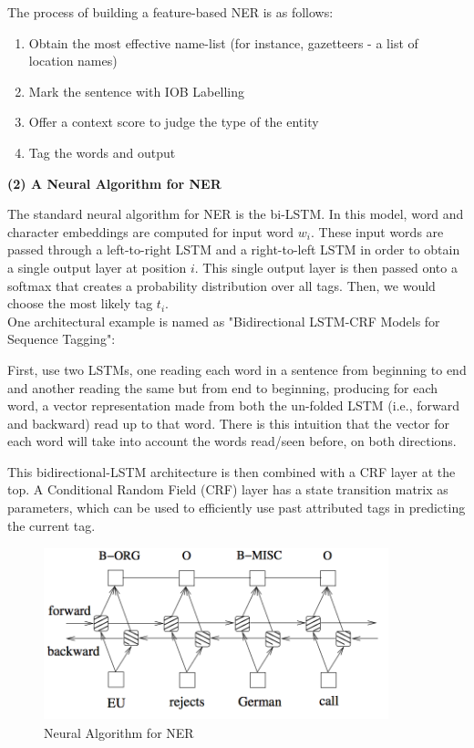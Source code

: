 \documentclass[a4paper,12pt]{report}
\begin{document}
\noindent
The process of building a feature-based NER is as follows:
\begin{enumerate}
\item Obtain the most effective name-list (for instance, gazetteers - a list of location names)
\item Mark the sentence with IOB Labelling
\item Offer a context score to judge the type of the entity
\item Tag the words and output 
\end{enumerate}

\noindent 
\textbf{(2) A Neural Algorithm for NER}

\noindent
The standard neural algorithm for NER is the bi-LSTM. In this model, word and character embeddings are computed for input word $w_i$. These input words are passed through a left-to-right LSTM and a right-to-left LSTM in order to obtain a single output layer at position $i$. This single output layer is then passed onto a softmax that creates a probability distribution over all tags. Then, we would choose the most likely tag $t_i$.\\

\noindent
One architectural example is named as "Bidirectional LSTM-CRF Models for Sequence Tagging":

\noindent
First, use two LSTMs, one reading each word in a sentence from beginning to end and another reading the same but from end to beginning, producing for each word, a vector representation made from both the un-folded LSTM (i.e., forward and backward) read up to that word. There is this intuition that the vector for each word will take into account the words read/seen before, on both directions.

\noindent
This bidirectional-LSTM architecture is then combined with a CRF layer at the top. A Conditional Random Field (CRF) layer has a state transition matrix as parameters, which can be used to efficiently use past attributed tags in predicting the current tag.

\begin{figure}[h]
\centering	
\includegraphics[width=10cm, height=5cm]{"pic1"}
\caption{Neural Algorithm for NER}
\end{figure}
\end{document}
